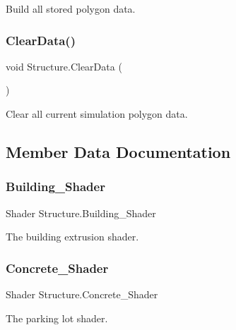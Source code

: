 Build all stored polygon data. 

\mbox{\label{class_structure_a403435d05e2eec3c6ede0d842ad67b53}} 
\subsubsection{\texorpdfstring{ClearData()}{ClearData()}}
{\footnotesize\ttfamily void Structure.\+Clear\+Data (\begin{DoxyParamCaption}{ }\end{DoxyParamCaption})}



Clear all current simulation polygon data. 



\subsection{Member Data Documentation}
\mbox{\label{class_structure_aa06a0148d5f248e9a906266898dc79d4}} 
\subsubsection{\texorpdfstring{Building\_Shader}{Building\_Shader}}
{\footnotesize\ttfamily Shader Structure.\+Building\+\_\+\+Shader}



The building extrusion shader. 

\mbox{\label{class_structure_a05c38269a337f5964de203d4b698cedd}} 
\subsubsection{\texorpdfstring{Concrete\_Shader}{Concrete\_Shader}}
{\footnotesize\ttfamily Shader Structure.\+Concrete\+\_\+\+Shader}



The parking lot shader. 

\mbox{\label{class_structure_a45d7defe9341ce74797d6fd86a6ed45f}} 
